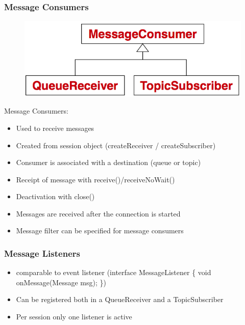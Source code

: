 \documentclass[10pt]{article}
\begin{document}
\subsubsection{Message Consumers}
\begin{figure}
	\centering
	\includegraphics[scale=0.2]{images/jms-api-message-consumer.png}%
\end{figure}
Message Consumers:
\begin{itemize}
	\item Used to receive messages
	\item Created from session object (createReceiver / createSubscriber)
	\item Consumer is associated with a destination (queue or topic)
	\item Receipt of message with receive()/receiveNoWait()
	\item Deactivation with close()
	\item Messages are received after the connection is started
	\item Message filter can be specified for message consumers
\end{itemize}
\subsubsection{Message Listeners}
\begin{itemize}
	\item comparable to event listener (interface MessageListener \{ void onMessage(Message msg); \})
	\item Can be registered both in a QueueReceiver and a TopicSubscriber
	\item Per session only one listener is active
\end{itemize}
\end{document}
